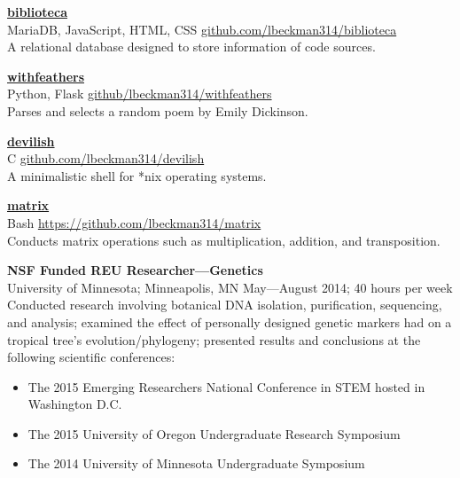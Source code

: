 \documentclass[a4paper]{article}
\begin{document}
\medbreak

\textbf{\href{https://biblioteca.liambeckman.com}{biblioteca}}\\
\textcolor[RGB]{128,128,128}{MariaDB, JavaScript, HTML, CSS \hfill \href{https://github.com/lbeckman314/biblioteca}{github.com/lbeckman314/biblioteca}}\\

A relational database designed to store information of code sources.

\medbreak

\textbf{\href{https://withfeathers.liambeckman.com}{withfeathers}}\\
\textcolor[RGB]{128,128,128}{Python, Flask \hfill \href{https://github.com/lbeckman314/withfeathers}{github/lbeckman314/withfeathers}}\\

Parses and selects a random poem by Emily Dickinson.


\medbreak

\textbf{\href{https://liambeckman.com/code/devilish}{devilish}}\\
\textcolor[RGB]{128,128,128}{C \hfill \href{https://github.com/lbeckman314/devilsh}{github.com/lbeckman314/devilish}}\\

A minimalistic shell for *nix operating systems.


\medbreak

\textbf{\href{https://liambeckman.com/code/matrix}{matrix}}\\
\textcolor[RGB]{128,128,128}{Bash \hfill \href{https://github.com/lbeckman314/matrix}{https://github.com/lbeckman314/matrix}}\\

Conducts matrix operations such as multiplication, addition, and transposition.


\medbreak

\textbf{NSF Funded REU Researcher—Genetics}\\
\textcolor[RGB]{128,128,128}{University of Minnesota; Minneapolis, MN \hfill  May—August 2014; 40 hours per week}\\
Conducted research involving botanical DNA isolation, purification, sequencing, and analysis; examined the effect of personally designed genetic markers had on a tropical tree's evolution/phylogeny; presented results and conclusions at the following scientific conferences:\\ 
\begin{itemize}
\item The 2015 Emerging Researchers National Conference in STEM hosted in Washington D.C.
\item The 2015 University of Oregon Undergraduate Research Symposium
\item The 2014 University of Minnesota Undergraduate Symposium
\end{itemize}
\end{document}

